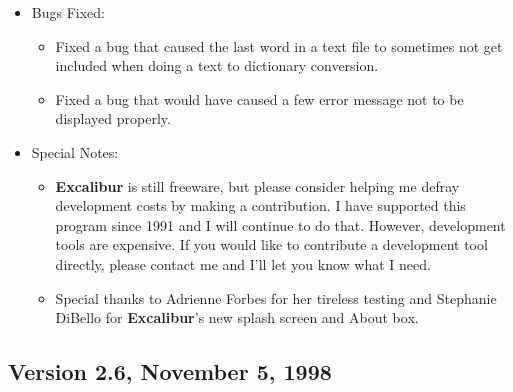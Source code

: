 ﻿\documentclass[11pt,titlepage]{article}
\newcommand{\ex}{\textbf{Excalibur}}
\begin{document}
\begin{itemize}
\begin{itemize}
  \item Many smaller changes.

  \end{itemize}

\item Bugs Fixed:
  \begin{itemize}

  \item Fixed a bug that caused the last word in a text file to
    sometimes not get included when doing a text to dictionary
    conversion.

  \item Fixed a bug that would have caused a few error message not to
    be displayed properly.

  \end{itemize}

\item Special Notes:

  \begin{itemize}

  \item \ex{} is still freeware, but please consider helping me defray
    development costs by making a contribution.  I have supported this
    program since 1991 and I will continue to do that.  However,
    development tools are expensive.  If you would like to contribute
    a development tool directly, please contact me and I'll let you
    know what I need.

  \item Special thanks to Adrienne Forbes for her tireless testing and
    Stephanie DiBello for \ex's new splash screen and About box.

  \end{itemize}

\end{itemize}


\subsection{Version 2.6, November 5, 1998}
\end{document}
